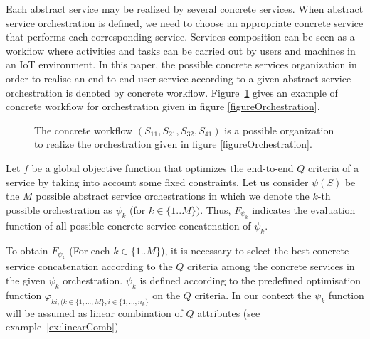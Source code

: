 \documentclass[10pt,journal,compsoc]{IEEEtran}
\begin{document}
Each abstract service may be realized by several concrete services. When abstract service orchestration is defined, we need to choose an appropriate concrete service that performs each corresponding service. Services composition can be seen as a workflow where activities and tasks can be carried out by users and machines in an IoT environment. %
In this paper, the possible concrete services organization in order to realise an end-to-end user service according to  a given abstract service orchestration is denoted by concrete workflow. Figure~\ref{figureConcreteOrchestration} gives an example of concrete workflow for orchestration given in figure \ref{figureOrchestration}.

\begin{figure}[htpb]
\label{figureConcreteOrchestration}
\centering {}
\caption{ The concrete workflow $(S_{11},S_{21},S_{32},S_{41})$ is a possible organization to realize the orchestration given in figure \ref{figureOrchestration}. }
\end{figure}

Let $f$ be a global objective function that optimizes the end-to-end $Q$ criteria of a service by taking into account some fixed constraints. Let us consider $\psi(S)$ be the $M$ possible abstract service orchestrations in which we denote the $k$-th possible orchestration as $\psi_k$ (for $k\in\{1..M\})$. Thus, $F_{\psi_k}$ indicates the evaluation function of all possible concrete service concatenation of $\psi_k$.%

To obtain $F_{\psi_k}$ (For each $k\in\{1..M\}$), it is necessary to select the best concrete service concatenation according to the $Q$ criteria among the concrete services in the given $\psi_k$ orchestration. $\psi_k$  is defined according to the predefined optimisation function $\varphi_{ki,(k \in\{1, \dots,M\}, i \in\{1,\dots,n_k\}}$ on the $Q$ criteria. In our context the $\psi_k$ function will be assumed as linear combination of $Q$ attributes (see example~\ref{ex:linearComb})
\end{document}
